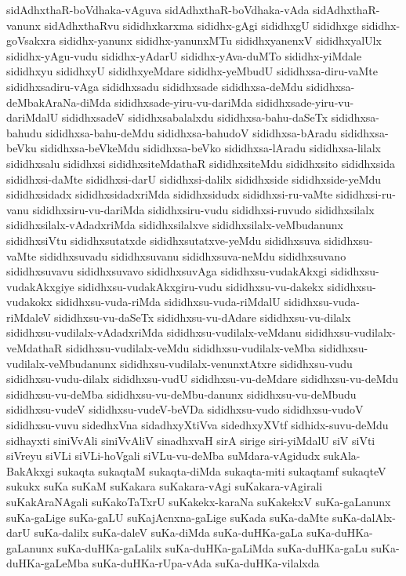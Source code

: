 {sidAdhxthaR-boVdhaka-vAguva
sidAdhxthaR-boVdhaka-vAda
sidAdhxthaR-vanunx
sidAdhxthaRvu
sididhxkarxma
sididhx-gAgi
sididhxgU
sididhxge
sididhx-goVsakxra
sididhx-yanunx
sididhx-yanunxMTu
sididhxyanenxV
sididhxyalUlx
sididhx-yAgu-vudu
sididhx-yAdarU
sididhx-yAva-duMTo
sididhx-yiMdale
sididhxyu
sididhxyU
sididhxyeMdare
sididhx-yeMbudU
sididhxsa-diru-vaMte
sididhxsadiru-vAga
sididhxsadu
sididhxsade
sididhxsa-deMdu
sididhxsa-deMbakAraNa-diMda
sididhxsade-yiru-vu-dariMda
sididhxsade-yiru-vu-dariMdalU
sididhxsadeV
sididhxsabalalxdu
sididhxsa-bahu-daSeTx
sididhxsa-bahudu
sididhxsa-bahu-deMdu
sididhxsa-bahudoV
sididhxsa-bAradu
sididhxsa-beVku
sididhxsa-beVkeMdu
sididhxsa-beVko
sididhxsa-lAradu
sididhxsa-lilalx
sididhxsalu
sididhxsi
sididhxsiteMdathaR
sididhxsiteMdu
sididhxsito
sididhxsida
sididhxsi-daMte
sididhxsi-darU
sididhxsi-dalilx
sididhxside
sididhxside-yeMdu
sididhxsidadx
sididhxsidadxriMda
sididhxsidudx
sididhxsi-ru-vaMte
sididhxsi-ru-vanu
sididhxsiru-vu-dariMda
sididhxsiru-vudu
sididhxsi-ruvudo
sididhxsilalx
sididhxsilalx-vAdadxriMda
sididhxsilalxve
sididhxsilalx-veMbudanunx
sididhxsiVtu
sididhxsutatxde
sididhxsutatxve-yeMdu
sididhxsuva
sididhxsu-vaMte
sididhxsuvadu
sididhxsuvanu
sididhxsuva-neMdu
sididhxsuvano
sididhxsuvavu
sididhxsuvavo
sididhxsuvAga
sididhxsu-vudakAkxgi
sididhxsu-vudakAkxgiye
sididhxsu-vudakAkxgiru-vudu
sididhxsu-vu-dakekx
sididhxsu-vudakokx
sididhxsu-vuda-riMda
sididhxsu-vuda-riMdalU
sididhxsu-vuda-riMdaleV
sididhxsu-vu-daSeTx
sididhxsu-vu-dAdare
sididhxsu-vu-dilalx
sididhxsu-vudilalx-vAdadxriMda
sididhxsu-vudilalx-veMdanu
sididhxsu-vudilalx-veMdathaR
sididhxsu-vudilalx-veMdu
sididhxsu-vudilalx-veMba
sididhxsu-vudilalx-veMbudanunx
sididhxsu-vudilalx-venunxtAtxre
sididhxsu-vudu
sididhxsu-vudu-dilalx
sididhxsu-vudU
sididhxsu-vu-deMdare
sididhxsu-vu-deMdu
sididhxsu-vu-deMba
sididhxsu-vu-deMbu-danunx
sididhxsu-vu-deMbudu
sididhxsu-vudeV
sididhxsu-vudeV-beVDa
sididhxsu-vudo
sididhxsu-vudoV
sididhxsu-vuvu
sidedhxVna
sidadhxyXtiVva
sidedhxyXVtf
sidhidx-suvu-deMdu
sidhayxti
siniVvAli
siniVvAliV
sinadhxvaH
sirA
sirige
siri-yiMdalU
siV
siVti
siVreyu
siVLi
siVLi-hoVgali
siVLu-vu-deMba
suMdara-vAgidudx
sukAla-BakAkxgi
sukaqta
sukaqtaM
sukaqta-diMda
sukaqta-miti
sukaqtamf
sukaqteV
sukukx
suKa
suKaM
suKakara
suKakara-vAgi
suKakara-vAgirali
suKakAraNAgali
suKakoTaTxrU
suKakekx-karaNa
suKakekxV
suKa-gaLanunx
suKa-gaLige
suKa-gaLU
suKajAcnxna-gaLige
suKada
suKa-daMte
suKa-dalAlx-darU
suKa-dalilx
suKa-daleV
suKa-diMda
suKa-duHKa-gaLa
suKa-duHKa-gaLanunx
suKa-duHKa-gaLalilx
suKa-duHKa-gaLiMda
suKa-duHKa-gaLu
suKa-duHKa-gaLeMba
suKa-duHKa-rUpa-vAda
suKa-duHKa-vilalxda
}
